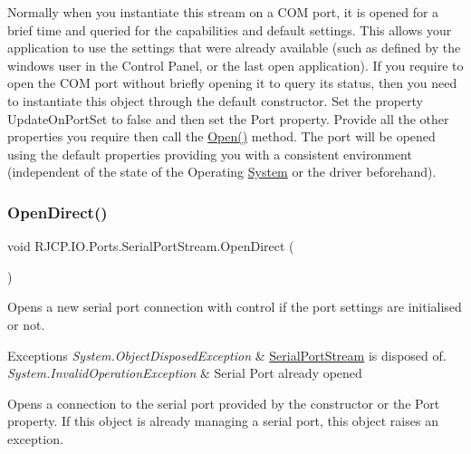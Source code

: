 Normally when you instantiate this stream on a C\+OM port, it is opened for a brief time and queried for the capabilities and default settings. This allows your application to use the settings that were already available (such as defined by the windows user in the Control Panel, or the last open application). If you require to open the C\+OM port without briefly opening it to query its status, then you need to instantiate this object through the default constructor. Set the property Update\+On\+Port\+Set to false and then set the Port property. Provide all the other properties you require then call the \mbox{\hyperlink{class_r_j_c_p_1_1_i_o_1_1_ports_1_1_serial_port_stream_aea440d3c8584ce6f55dc63e57f473198}{Open()}} method. The port will be opened using the default properties providing you with a consistent environment (independent of the state of the Operating \mbox{\hyperlink{namespace_system}{System}} or the driver beforehand).\mbox{\label{class_r_j_c_p_1_1_i_o_1_1_ports_1_1_serial_port_stream_a70baceb9a6f16383320da15e2508b4c1}} 
\subsubsection{\texorpdfstring{OpenDirect()}{OpenDirect()}}
{\footnotesize\ttfamily void R\+J\+C\+P.\+I\+O.\+Ports.\+Serial\+Port\+Stream.\+Open\+Direct (\begin{DoxyParamCaption}{ }\end{DoxyParamCaption})}



Opens a new serial port connection with control if the port settings are initialised or not. 


\begin{DoxyExceptions}{Exceptions}
{\em System.\+Object\+Disposed\+Exception} & \mbox{\hyperlink{class_r_j_c_p_1_1_i_o_1_1_ports_1_1_serial_port_stream}{Serial\+Port\+Stream}} is disposed of.\\
\hline
{\em System.\+Invalid\+Operation\+Exception} & Serial Port already opened\\
\hline
\end{DoxyExceptions}


Opens a connection to the serial port provided by the constructor or the Port property. If this object is already managing a serial port, this object raises an exception. 

